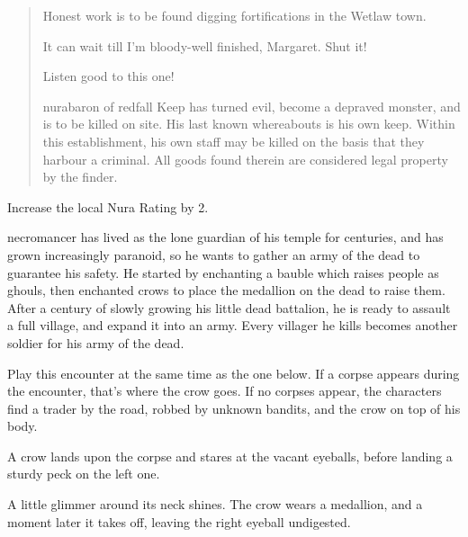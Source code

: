 \begin{multicols}{2}
\begin{boxtext}
\begin{verse}
		Honest work is to be found digging fortifications in the Wetlaw town.

		It can wait till I'm bloody-well finished, Margaret.  Shut it!

		Listen good to this one!

		\gls{nurabaron} of \gls{redfall} Keep has turned evil, become a depraved monster, and is to be killed on site.  His last known whereabouts is his own keep.  Within this establishment, his own staff may be killed on the basis that they harbour a criminal.  All goods found therein are considered legal property by the finder.

	\end{verse}

\end{boxtext}

Increase the local Nura Rating by 2.

\resumecontents[Forest]

\label{necromancerspet}

\sqminitoc

\stopcontents[Forest]

\Gls{necromancer} has lived as the lone guardian of his temple for centuries, and has grown increasingly paranoid, so he wants to gather an army of the dead to guarantee his safety.
He started by enchanting a bauble which raises people as ghouls, then enchanted crows to place the medallion on the dead to raise them.
After a century of slowly growing his little dead battalion, he is ready to assault a full village, and expand it into an army.
Every villager he kills becomes another soldier for his army of the dead.


Play this encounter at the same time as the one below.  If a corpse appears during the encounter, that's where the crow goes.  If no corpses appear, the characters find a trader by the road, robbed by unknown bandits, and the crow on top of his body.

\begin{boxtext}
	A crow lands upon the corpse and stares at the vacant eyeballs, before landing a sturdy peck on the left one.

	A little glimmer around its neck shines.  The crow wears a medallion, and a moment later it takes off, leaving the right eyeball undigested.

\end{boxtext}


\end{multicols}
